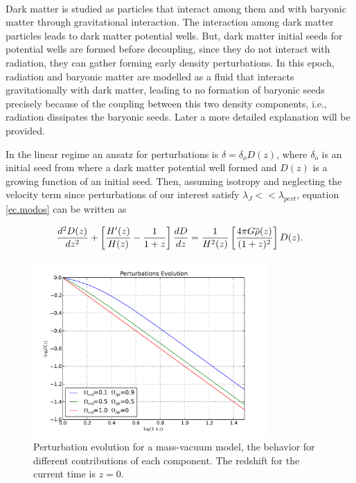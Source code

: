 \

Dark matter is studied as particles that interact among them and with baryonic matter through 
gravitational interaction. 
The interaction among dark matter particles leads to dark matter potential wells.
But, dark matter initial seeds for potential wells are formed before decoupling, 
since they do not interact with radiation,
they can gather forming early density perturbations. In this epoch, radiation
and baryonic matter are modelled as a fluid that interacts gravitationally with 
dark matter, leading to no formation of baryonic seeds precisely because of the 
coupling between this two density components, i.e., radiation dissipates the baryonic
seeds.
Later a more detailed explanation will be provided.

In the linear regime an ansatz for perturbations is $\delta = \delta_oD(z)$,
where $\delta_o$ is an initial seed from where a dark matter potential well formed
and $D(z)$ is a growing function of an initial seed.
Then, assuming isotropy and neglecting the velocity term since perturbations of our
interest satisfy $\lambda_J << \lambda_{pert}$, equation \ref{ec.modos} can be written
as

\begin{equation}
\frac{d^2D(z)}{dz^2}+\left[ \frac{H'(z)}{H(z)} -\frac{1}{1+z}\right]\frac{d D}{d z}
= \frac{1}{H^2(z)}\left[ \frac{4\pi G\overline{\rho}(z)}{(1+z)^2} \right]D(z). 
\nonumber
\end{equation}

\begin{figure}[htbp]
       \centering
               \includegraphics[width=0.8\textwidth]{Images/chapter2/masavacio.pdf}
       \caption{\small Perturbation evolution for a mass-vacuum model, the behavior
       for different contributions of each component. The redshift for the current time is $z=0$. }
       \label{masavacio}
 \end{figure}

